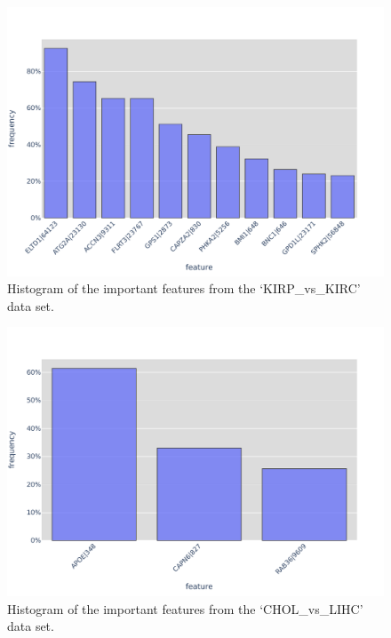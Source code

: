 \begin{figure}[H]
    \centering
    \includegraphics[width=0.9\columnwidth]{figures/genes/featureHistogram_TCGA_KIRP_vs_KIRC.pdf}
    \caption{Histogram of the important features from the `KIRP\_vs\_KIRC' data set.}\label{fig:histKIRPvsKIRC}
\end{figure}
\begin{figure}[H]
    \centering
    \includegraphics[width=0.9\columnwidth]{figures/genes/featureHistogram_TCGA_CHOL_vs_LIHC.pdf}
    \caption{Histogram of the important features from the `CHOL\_vs\_LIHC' data set.}\label{fig:histCHOLvsLIHC}
\end{figure}
